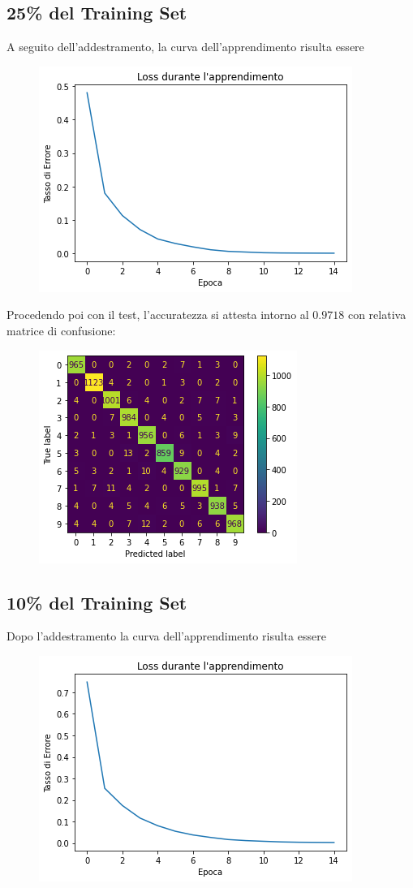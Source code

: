 \documentclass[12pt, a4paper]{article}
\begin{document}
\subsection{25\% del Training Set}
A seguito dell'addestramento, la curva dell'apprendimento risulta essere
\begin{figure}[H]
    \centering
    \includegraphics[width=.5\textwidth]{Set25.png}
\end{figure}

Procedendo poi con il test, l'accuratezza si attesta intorno al \(0.9718\) con relativa matrice di confusione:
\begin{figure}[H]
    \centering
    \includegraphics[width=.5\textwidth]{Matrix25.png}
\end{figure}

\subsection{10\% del Training Set}
Dopo l'addestramento la curva dell'apprendimento risulta essere
\begin{figure}[H]
    \centering
    \includegraphics[width=.5\textwidth]{Set10.png}
\end{figure}
\end{document}
